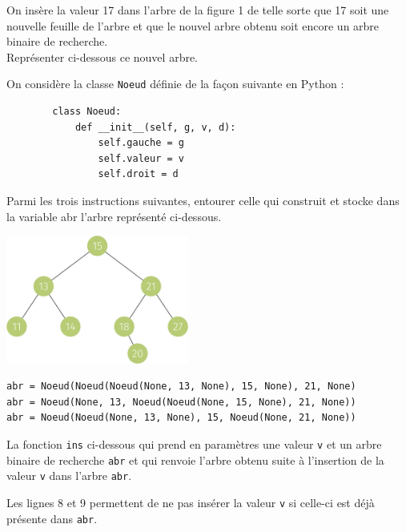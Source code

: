 \documentclass[a4paper,12pt,eval,firamath]{nsi}
\begin{document}
On insère la valeur 17 dans l'arbre de la figure 1 de telle sorte que 17 soit une
nouvelle feuille de l'arbre et que le nouvel arbre obtenu soit encore un arbre
binaire de recherche.\\

\question Représenter ci-dessous ce nouvel arbre.\\

On considère la classe \texttt{Noeud} définie de la façon suivante en Python :


\begin{verbatim}
        class Noeud:
            def __init__(self, g, v, d):
                self.gauche = g
                self.valeur = v
                self.droit = d
\end{verbatim}

\question Parmi les trois instructions suivantes, entourer celle qui construit et stocke dans la variable abr l'arbre représenté ci-dessous.
\begin{center}
      \includegraphics[width=6cm]{img/fig1}
\end{center}


\begin{verbatim}
abr = Noeud(Noeud(Noeud(None, 13, None), 15, None), 21, None)
abr = Noeud(None, 13, Noeud(Noeud(None, 15, None), 21, None))
abr = Noeud(Noeud(None, 13, None), 15, Noeud(None, 21, None)) 
\end{verbatim}

La fonction \texttt{ins} ci-dessous qui
prend en paramètres une valeur \texttt{v} et un arbre binaire de recherche \texttt{abr} et qui
renvoie l'arbre obtenu suite à l'insertion de la valeur \texttt{v} dans l'arbre \texttt{abr}.

Les lignes 8 et 9 permettent de ne pas insérer la valeur \texttt{v} si celle-ci est déjà présente dans \texttt{abr}.
\end{document}
